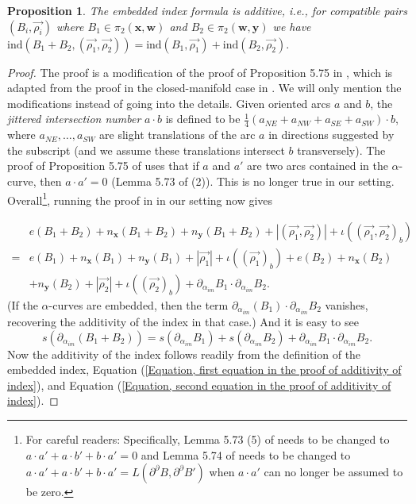 \documentclass{amsart}
\newtheorem{prop}[thm]{Proposition}
\theoremstyle{definition}
\theoremstyle{remark}
\numberwithin{equation}{section}
\numberwithin{equation}{section} \makeatletter
\begin{document}
\begin{prop}\label{Proposition, embedded index formula is additive}
The embedded index formula is additive, i.e., for compatible pairs $(B_i,\overrightarrow{\rho_i})$ where $B_1\in\pi_2(\bm{x},\bm{w})$ and $B_2\in \pi_2(\bm{w},\bm{y})$ we have $\text{ind}(B_1+B_2,(\overrightarrow{\rho_1},\overrightarrow{\rho_2}))=\text{ind}(B_1,\overrightarrow{\rho_1})+\text{ind}(B_2,\overrightarrow{\rho_2}).$
\end{prop}
\begin{proof}
The proof is a modification of the proof of Proposition 5.75 in \cite{LOT18}, which is adapted from the proof in the closed-manifold case in \cite{Sarkar2011}. We will only mention the modifications instead of going into the details. Given oriented arcs $a$ and $b$, the \emph{jittered intersection number} $a\cdot b$ is defined to be $\frac{1}{4}(a_{NE}+a_{NW}+a_{SE}+a_{SW})\cdot b$, where $a_{NE},\ldots ,a_{SW}$ are slight translations of the arc $a$ in directions suggested by the subscript (and we assume these translations intersect $b$ transversely). The proof of Proposition 5.75 of \cite{LOT18} uses that if $a$ and $a'$ are two arcs contained in the $\alpha$-curve, then $a\cdot a'=0$ (Lemma 5.73 of \cite{LOT18} (2)). This is no longer true in our setting. Overall\footnote{For careful readers: Specifically, Lemma 5.73 (5) of \cite{LOT18} needs to be changed to $a\cdot a'+a\cdot b'+b\cdot a'=0$ and Lemma 5.74 of \cite{LOT18} needs to be changed to $a\cdot a'+a\cdot b'+b\cdot a'=L(\partial^\partial B,\partial^\partial B')$ when $a\cdot a'$ can no longer be assumed to be zero.}, running the proof in \cite{LOT18} in our setting now gives 

\begin{equation}\label{Equation, first equation in the proof of additivity of index}
\begin{aligned}
&e(B_1+B_2)+n_{\bm{x}}(B_1+B_2)+n_{\bm{y}}(B_1+B_2)+|(\overrightarrow{\rho_1},\overrightarrow{\rho_2})|+\iota((\overrightarrow{\rho_1},\overrightarrow{\rho_2})_b)\\
=&e(B_1)+n_{\bm{x}}(B_1)+n_{\bm{y}}(B_1)+|\overrightarrow{\rho_1}|+\iota((\overrightarrow{\rho_1})_b)+e(B_2)+n_{\bm{x}}(B_2)\\
&+n_{\bm{y}}(B_2)+|\overrightarrow{\rho_2}|+\iota((\overrightarrow{\rho_2})_b)+\partial_{\alpha_{im}}B_1\cdot \partial_{\alpha_{im}}B_2.
\end{aligned}
\end{equation}
(If the $\alpha$-curves are embedded, then the term $\partial_{\alpha_{im}}(B_1)\cdot \partial_{\alpha_{im}}B_2$ vanishes, recovering the additivity of the index in that case.) And it is easy to see 
\begin{equation}\label{Equation, second equation in the proof of additivity of index}
s(\partial_{\alpha_{im}}(B_1+B_2))=s(\partial_{\alpha_{im}}B_1)+s(\partial_{\alpha_{im}}B_2)+\partial_{\alpha_{im}}B_1\cdot \partial_{\alpha_{im}}B_2.
\end{equation}
Now the additivity of the index follows readily from the definition of the embedded index, Equation (\ref{Equation, first equation in the proof of additivity of index}), and Equation (\ref{Equation, second equation in the proof of additivity of index}).
\end{proof}
\end{document}
